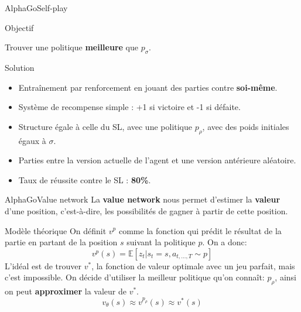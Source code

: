 \begin{frame}{AlphaGo}{Self-play}
    \begin{block}{Objectif}
        \begin{center}
            Trouver une politique \textbf{meilleure} que $p_\sigma$.
        \end{center}
    \end{block}

    \begin{block}{Solution}
        \begin{itemize}
            \item Entraînement par renforcement en jouant des parties contre \textbf{soi-même}.
            \item Système de recompense simple : +1 si victoire et -1 si défaite.
            \item Structure égale à celle du SL, avec une politique $p_\rho$, avec des poids initiales égaux à $\sigma$.
            \item Parties entre la version actuelle de l'agent et une version antérieure aléatoire.
            \item Taux de réussite contre le SL : \textbf{80\%}.
        \end{itemize}
    \end{block}
\end{frame}


\begin{frame}{AlphaGo}{Value network}
    La \textbf{value network} nous permet d'estimer la \textbf{valeur} d'une position, c'est-à-dire, les possibilités de gagner à partir de cette position.
    \begin{block}{Modèle théorique}
        On définit $v^p$ comme la fonction qui prédit le résultat de la partie en partant de la position $s$ suivant la politique $p$. On a donc: $$v^p(s) = \mathbb{E}[z_t|s_t=s, a_{t,\dots,T}\sim p]$$
        L'idéal est de trouver $v^*$, la fonction de valeur optimale avec un jeu parfait, mais c'est impossible.
        On décide d'utiliser la meilleur politique qu'on connaît: $p_\rho$, ainsi on peut \textbf{approximer} la valeur de $v^*$. $$v_\theta(s) \approx v^{p_\rho}(s) \approx v^*(s)$$
    \end{block}
\end{frame}

